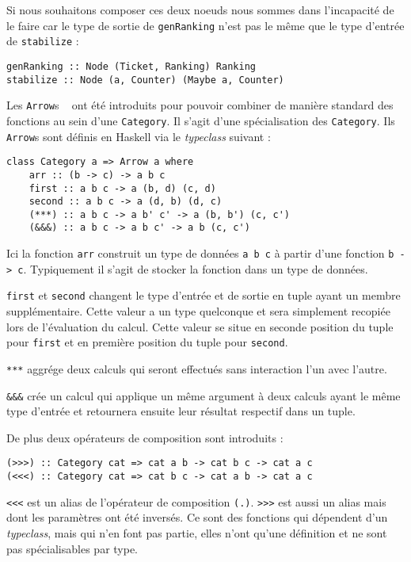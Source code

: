 \documentclass{llncs}
\newcommand{\Arrs}{\lstinline{Arrow}s }
\begin{document}
Si nous souhaitons composer ces deux noeuds nous sommes dans l'incapacité de le
faire car le type de sortie de \lstinline{genRanking} n'est pas le même que le
type d'entrée de \lstinline{stabilize} :
\begin{lstlisting}
genRanking :: Node (Ticket, Ranking) Ranking
stabilize :: Node (a, Counter) (Maybe a, Counter)
\end{lstlisting}

Les \Arrs~\cite{Hughes00} ont été introduits pour pouvoir combiner de manière
standard des fonctions au sein d'une \lstinline{Category}.
Il s'agit d'une spécialisation des \lstinline{Category}.
Ils \Arrs sont définis en Haskell via le \emph{typeclass} suivant :
\begin{lstlisting}
class Category a => Arrow a where
    arr :: (b -> c) -> a b c
    first :: a b c -> a (b, d) (c, d)
    second :: a b c -> a (d, b) (d, c)
    (***) :: a b c -> a b' c' -> a (b, b') (c, c')
    (&&&) :: a b c -> a b c' -> a b (c, c')
\end{lstlisting}

Ici la fonction \lstinline{arr} construit un type de données
\lstinline{a b c} à partir d'une fonction \lstinline{b -> c}.
Typiquement il s'agit de stocker la fonction dans un type de données.

\lstinline{first} et \lstinline{second} changent le type d'entrée et de sortie
en tuple ayant un membre supplémentaire.
Cette valeur a un type quelconque et sera simplement recopiée lors de l'évaluation
du calcul.
Cette valeur se situe en seconde position du tuple pour \lstinline{first} et en
première position du tuple pour \lstinline{second}.

\lstinline{***} aggrége deux calculs qui seront effectués sans interaction l'un
avec l'autre.

\lstinline{&&&} crée un calcul qui applique un même argument à deux calculs ayant
le même type d'entrée et retournera ensuite leur résultat respectif dans un tuple.

De plus deux opérateurs de composition sont introduits :
\begin{lstlisting}
(>>>) :: Category cat => cat a b -> cat b c -> cat a c
(<<<) :: Category cat => cat b c -> cat a b -> cat a c
\end{lstlisting}

\lstinline{<<<} est un alias de l'opérateur de composition \lstinline{(.)}.
\lstinline{>>>} est aussi un alias mais dont les paramètres ont été inversés.
Ce sont des fonctions qui dépendent d'un \emph{typeclass}, mais qui n'en font pas
partie, elles n'ont qu'une définition et ne sont pas spécialisables par type.
\end{document}

